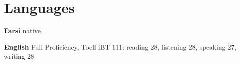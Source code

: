 \section{Languages}
\begin{compactitem} 
\item \textbf{Farsi} native 
\item \textbf{English} Full Proficiency, Toefl iBT 111: reading 28, listening 28, speaking 27, writing 28
\end{compactitem}

